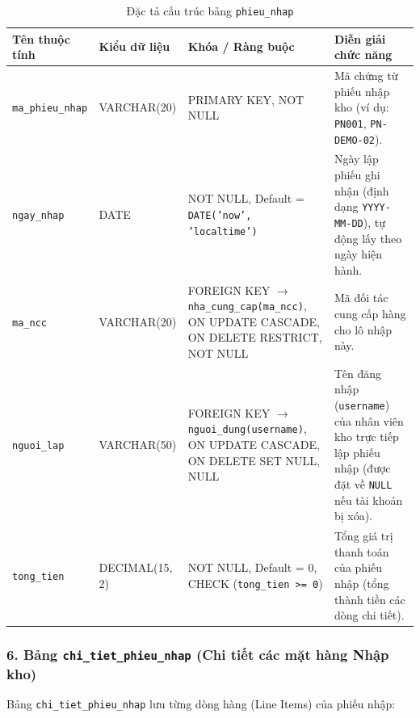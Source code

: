 \documentclass[12pt,a4paper]{article}
\begin{document}
\begin{table}[H]
\centering
\small
\renewcommand{\arraystretch}{1.2}
\begin{tabularx}{\textwidth}{|>{\raggedright\arraybackslash}p{3.0cm}|>{\raggedright\arraybackslash}p{2.6cm}|>{\raggedright\arraybackslash}p{3.8cm}|>{\raggedright\arraybackslash}X|}
\hline
\textbf{Tên thuộc tính} & \textbf{Kiểu dữ liệu} & \textbf{Khóa / Ràng buộc} & \textbf{Diễn giải chức năng} \\
\hline
\texttt{ma\_phieu\_nhap} & VARCHAR(20) & PRIMARY KEY, NOT NULL & Mã chứng từ phiếu nhập kho (ví dụ: \texttt{PN001}, \texttt{PN-DEMO-02}). \\
\hline
\texttt{ngay\_nhap} & DATE & NOT NULL, Default = \texttt{DATE('now', 'localtime')} & Ngày lập phiếu ghi nhận (định dạng \texttt{YYYY-MM-DD}), tự động lấy theo ngày hiện hành. \\
\hline
\texttt{ma\_ncc} & VARCHAR(20) & FOREIGN KEY $\rightarrow$ \texttt{nha\_cung\_cap(ma\_ncc)}, ON UPDATE CASCADE, ON DELETE RESTRICT, NOT NULL & Mã đối tác cung cấp hàng cho lô nhập này. \\
\hline
\texttt{nguoi\_lap} & VARCHAR(50) & FOREIGN KEY $\rightarrow$ \texttt{nguoi\_dung(username)}, ON UPDATE CASCADE, ON DELETE SET NULL, NULL & Tên đăng nhập (\texttt{username}) của nhân viên kho trực tiếp lập phiếu nhập (được đặt về \texttt{NULL} nếu tài khoản bị xóa). \\
\hline
\texttt{tong\_tien} & DECIMAL(15, 2) & NOT NULL, Default = 0, CHECK (\texttt{tong\_tien >= 0}) & Tổng giá trị thanh toán của phiếu nhập (tổng thành tiền các dòng chi tiết). \\
\hline
\end{tabularx}
\caption{Đặc tả cấu trúc bảng \texttt{phieu\_nhap}}
\label{tab:csdl-phieunhap}
\end{table}

\newpage
\subsubsection*{6. Bảng \texttt{chi\_tiet\_phieu\_nhap} (Chi tiết các mặt hàng Nhập kho)}
Bảng \texttt{chi\_tiet\_phieu\_nhap} lưu từng dòng hàng (Line Items) của phiếu nhập:
\end{document}
